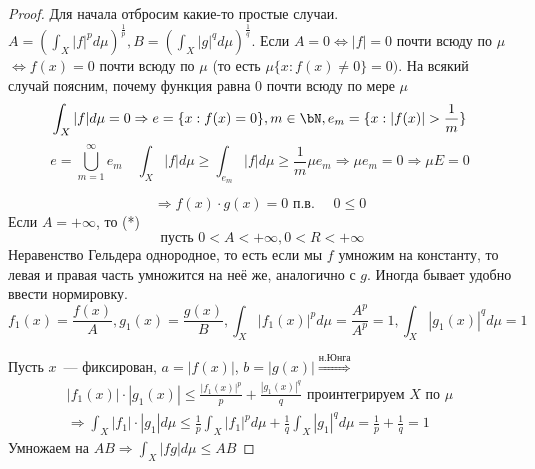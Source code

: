 \documentclass[document]{subfiles}
\begin{document}
\begin{proof}
Для начала отбросим какие-то простые случаи. \\
$A = \left( \int_X |f|^p d \mu \right)^{\frac{1}{p}}, B = \left( \int_X |g|^q d \mu \right)^{\frac{1}{q}}$.
Если $A = 0 \Leftrightarrow |f| = 0$ почти всюду по $\mu$ $\Leftrightarrow f(x) = 0$ почти всюду по $\mu$ (то есть $\mu \{x: f(x) \ne 0 \} = 0)$.
На всякий случай поясним, почему функция равна 0 почти всюду по мере $\mu$
\[ \int_X |f| d \mu = 0 \Rightarrow e = \{x: f(x) = 0 \}, m \in \bN, e_m = \{x: |f(x)| > \frac{1}{m} \} \]
\[e = \bigcup^\infty_{m=1} e_m \quad \int_X |f| d \mu \geq \int_{e_m} |f| d\mu \geq \frac{1}{m} \mu e_m \Rightarrow \mu e_m = 0 \Rightarrow \mu E = 0 \]

\[ \Rightarrow f(x) \cdot g(x) = 0 \text { п.в. } \quad 0 \leq 0 \tag{*} \]
Если $A = +\infty$, то (*) 
\[ \text{ пусть } 0 < A < +\infty, 0 < R < +\infty \]
Неравенство Гельдера однородное, то есть если мы $f$ умножим на константу, то левая и правая часть умножится на неё же, аналогично с $g$. Иногда
бывает удобно ввести нормировку.
\[ f_1(x) = \frac{f(x)}{A}, g_1(x) = \frac{g(x)}{B}, \int_X |f_1(x)|^p d\mu = \frac{A^p}{A^p} = 1, \int_X |g_1(x)|^q d \mu = 1 \]

Пусть $x$~--- фиксирован, $a = |f(x)|$, $b = |g(x)| \stackrel{\text{н.Юнга}}{\Rightarrow}$ 
\begin{multline*}
    |f_1(x)| \cdot |g_1(x)| \leq \frac{|f_1(x)|^p}{p} + \frac{|g_1(x)|^q}{q} \text{ проинтегрируем } X \text { по } \mu \\
    \Rightarrow \int_X |f_1| \cdot |g_1| d \mu \leq \frac{1}{p} \int_X |f_1|^p d\mu + \frac{1}{q} \int_X |g_1|^q d\mu = \frac{1}{p} + \frac{1}{q} = 1
\end{multline*}
Умножаем на $AB \Rightarrow \int_X |fg| d \mu \leq AB $
\end{proof}
\end{document}
